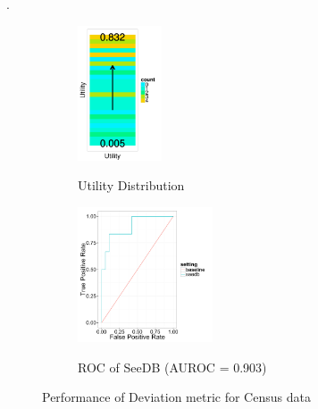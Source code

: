 

.

\begin{figure}[t]
	\centering
	\begin{subfigure}{0.32\linewidth}
		{\includegraphics[trim={0 1.3cm 0 0}, clip, width=2.5cm]{Images/census_gt_distribution.pdf}}
		\caption{Utility Distribution}
		\label{fig:gt_dist}
	\end{subfigure}
	\begin{subfigure}{0.65\linewidth}
		\centering 
		{\includegraphics[width=4cm] {Images/seedb_roc.pdf}} 
		\caption{ROC of SeeDB (AUROC = 0.903)}
		\label{fig:roc}
	\end{subfigure}
	\caption{Performance of Deviation metric for Census data}
	\vspace{-20pt}
	\label{fig:census_gt}
\end{figure}

